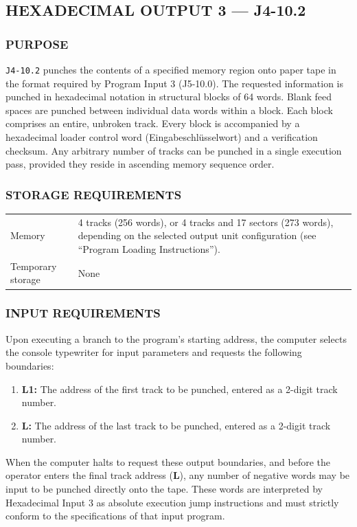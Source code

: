 \subsection*{HEXADECIMAL OUTPUT 3 --- J4-10.2}
\label{sec:hexadecimal-output-3}

\subsubsection*{PURPOSE}
\texttt{J4-10.2} punches the contents of a specified memory region onto paper tape in the format required by Program Input 3 (J5-10.0). The requested information is punched in hexadecimal notation in structural blocks of 64 words. Blank feed spaces are punched between individual data words within a block. Each block comprises an entire, unbroken track. Every block is accompanied by a hexadecimal loader control word (Eingabeschlüsselwort) and a verification checksum. Any arbitrary number of tracks can be punched in a single execution pass, provided they reside in ascending memory sequence order.

\subsubsection*{STORAGE REQUIREMENTS}
\begin{center}
\begin{tabularx}{\textwidth}{lX}
    \toprule
    Memory & 4 tracks (256 words), or 4 tracks and 17 sectors (273 words), depending on the selected output unit configuration (see ``Program Loading Instructions''). \\
    Temporary storage    & None \\
    \bottomrule
\end{tabularx}
\end{center}

\subsubsection*{INPUT REQUIREMENTS}
Upon executing a branch to the program's starting address, the computer selects the console typewriter for input parameters and requests the following boundaries:
\begin{enumerate}
    \item \textbf{L1:} The address of the first track to be punched, entered as a 2-digit track number.
    \item \textbf{L:} The address of the last track to be punched, entered as a 2-digit track number.
\end{enumerate}
When the computer halts to request these output boundaries, and before the operator enters the final track address (\textbf{L}), any number of negative words may be input to be punched directly onto the tape. These words are interpreted by Hexadecimal Input 3 as absolute execution jump instructions and must strictly conform to the specifications of that input program.


